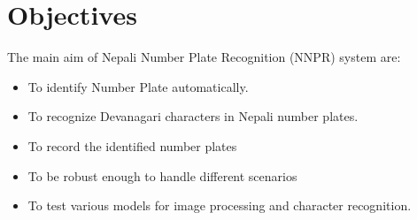 \section{Objectives}
The main aim of Nepali Number Plate Recognition (NNPR) system are:\ 
\begin{itemize}
    \item To identify Number Plate automatically. 
    \item To recognize Devanagari characters in Nepali number plates.
    \item To record the identified number plates
    \item To be robust enough to handle different scenarios
    \item To test various models for image processing and character recognition.
\end{itemize}
